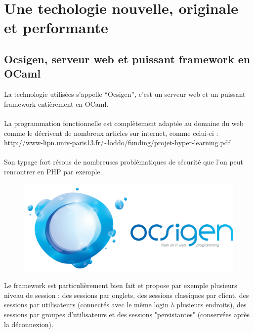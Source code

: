 \documentclass{life-fr}
\begin{document}

\chapter{Une techologie nouvelle, originale et performante}

\section{Ocsigen, serveur web et puissant framework en OCaml}

La technologie utilisées s'appelle ``Ocsigen'', c'est un serveur web et un puissant framework entièrement en OCaml.\\
  \\
La programmation fonctionnelle est complètement adaptée au domaine du web comme le décrivent de nombreux articles sur internet, comme celui-ci :\\
\url{http://www-lipn.univ-paris13.fr/~loddo/funding/projet-hyper-learning.pdf}\\
\\
Son typage fort résous de nombreuses problématiques de sécurité que l'on peut rencontrer en PHP par exemple.\\

\begin{figure}[H]
  \begin{center}
    \includegraphics[width=13cm]{img/ocsigen.png}
  \end{center}
\end{figure}

Le framework est particulièrement bien fait et propose par exemple plusieurs niveau de session : des sessions par onglets, des sessions classiques par client, des sessions par utilisateurs (connectés avec le même login à plusieurs endroits), des sessions par groupes d'utilisateurs et des sessions "persistantes" (conservées après la déconnexion).\\
\end{document}
